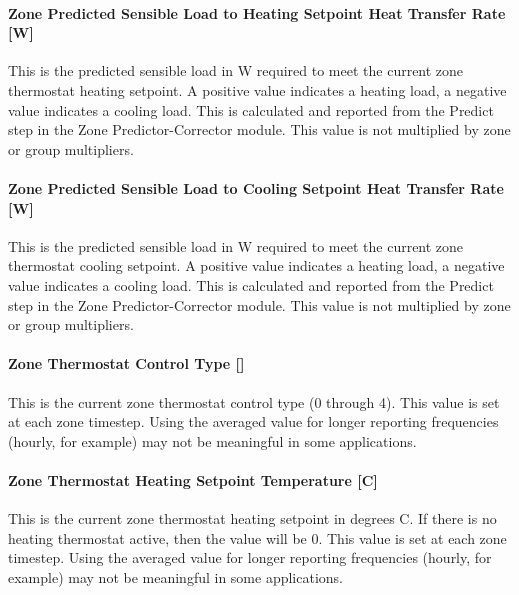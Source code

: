 \paragraph{Zone Predicted Sensible Load to Heating Setpoint Heat Transfer Rate {[}W{]}}\label{zone-predicted-sensible-load-to-heating-setpoint-heat-transfer-rate-w}

This is the predicted sensible load in W required to meet the current zone thermostat heating setpoint. A positive value indicates a heating load, a negative value indicates a cooling load. This is calculated and reported from the Predict step in the Zone Predictor-Corrector module. This value is not multiplied by zone or group multipliers.

\paragraph{Zone Predicted Sensible Load to Cooling Setpoint Heat Transfer Rate {[}W{]}}\label{zone-predicted-sensible-load-to-cooling-setpoint-heat-transfer-rate-w}

This is the predicted sensible load in W required to meet the current zone thermostat cooling setpoint. A positive value indicates a heating load, a negative value indicates a cooling load. This is calculated and reported from the Predict step in the Zone Predictor-Corrector module. This value is not multiplied by zone or group multipliers.

\paragraph{\texorpdfstring{Zone Thermostat Control Type {[]}}{Zone Thermostat Control Type }}\label{zone-thermostat-control-type}

This is the current zone thermostat control type (0 through 4). This value is set at each zone timestep. Using the averaged value for longer reporting frequencies (hourly, for example) may not be meaningful in some applications.

\paragraph{Zone Thermostat Heating Setpoint Temperature {[}C{]}}\label{zone-thermostat-heating-setpoint-temperature-c}

This is the current zone thermostat heating setpoint in degrees C. If there is no heating thermostat active, then the value will be 0. This value is set at each zone timestep. Using the averaged value for longer reporting frequencies (hourly, for example) may not be meaningful in some applications.


